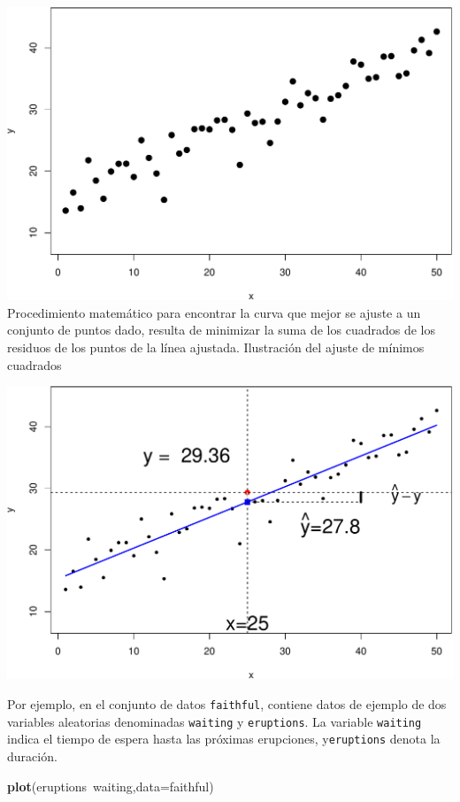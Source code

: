 \documentclass[]{article}
\newenvironment{Shaded}{\begin{snugshade}}{\end{snugshade}}
\newcommand{\KeywordTok}[1]{\textcolor[rgb]{0.13,0.29,0.53}{\textbf{{#1}}}}
\newcommand{\DataTypeTok}[1]{\textcolor[rgb]{0.13,0.29,0.53}{{#1}}}
\newcommand{\NormalTok}[1]{{#1}}
\numberwithin{equation}{section}
\begin{document}
\includegraphics{tema6_files/figure-latex/unnamed-chunk-2-1.pdf}
Procedimiento matemático para encontrar la curva que mejor se ajuste a
un conjunto de puntos dado, resulta de minimizar la suma de los
cuadrados de los residuos de los puntos de la línea ajustada.
Ilustración del ajuste de mínimos cuadrados

\includegraphics{tema6_files/figure-latex/unnamed-chunk-3-1.pdf}

Por ejemplo, en el conjunto de datos \texttt{faithful}, contiene datos
de ejemplo de dos variables aleatorias denominadas \texttt{waiting} y
\texttt{eruptions}. La variable \texttt{waiting} indica el tiempo de
espera hasta las próximas erupciones, y\texttt{eruptions} denota la
duración.

\begin{Shaded}
\begin{Highlighting}[]
\KeywordTok{plot}\NormalTok{(eruptions~waiting,}\DataTypeTok{data=}\NormalTok{faithful)}
\end{Highlighting}
\end{Shaded}
\end{document}
